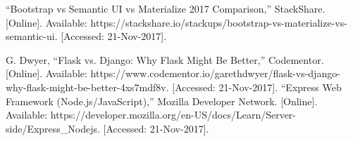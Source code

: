 \documentclass[onecolumn, draftclsnofoot,10pt, compsoc]{IEEEtran}
\begin{document}
\begin{thebibliography}{9}
“Bootstrap vs Semantic UI vs Materialize 2017 Comparison,” StackShare. [Online]. Available: https://stackshare.io/stackups/bootstrap-vs-materialize-vs-semantic-ui. [Accessed: 21-Nov-2017].

G. Dwyer, “Flask vs. Django: Why Flask Might Be Better,” Codementor. [Online]. Available: https://www.codementor.io/garethdwyer/flask-vs-django-why-flask-might-be-better-4xs7mdf8v. [Accessed: 21-Nov-2017].
“Express Web Framework (Node.js/JavaScript),” Mozilla Developer Network. [Online]. Available: https://developer.mozilla.org/en-US/docs/Learn/Server-side/Express\_Nodejs. [Accessed: 21-Nov-2017].



\end{thebibliography}
\end{document}
